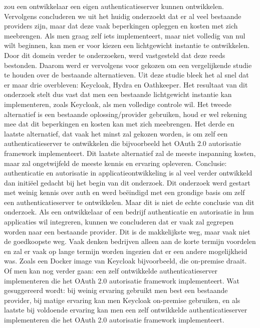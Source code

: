 zou een ontwikkelaar een eigen authenticatieserver kunnen ontwikkelen. Vervolgens concluderen we uit het huidig onderzoekt dat er al veel bestaande 
providers zijn, maar dat deze vaak beperkingen opleggen en kosten met zich meebrengen. Als men graag zelf iets implementeert, maar niet volledig
van nul wilt beginnen, kan men er voor kiezen een lichtgewicht instantie te ontwikkelen. Door dit domein verder te onderzoeken, werd vastgesteld 
dat deze reeds bestonden. Daarom werd er vervolgens voor gekozen om een vergelijkende studie te houden over de bestaande alternatieven. Uit deze
studie bleek het al snel dat er maar drie overbleven: Keycloak, Hydra en Oathkeeper. Het resultaat van dit onderzoek stelt dus vast dat men een bestaande
lichtgewicht instantie kan implementeren, zoals Keycloak, als men volledige controle wil. Het tweede alternatief is een bestaande oplossing/provider
gebruiken, houd er wel rekening mee dat dit beperkingen en kosten kan met zich meebrengen. Het derde en laatste alternatief, dat vaak het minst zal
gekozen worden, is om zelf een authenticatieserver te ontwikkelen die bijvoorbeeld het OAuth 2.0 autorisatie framework implementeert. Dit laatste alternatief
zal de meeste inspanning kosten, maar zal ongetwijfeld de meeste kennis en ervaring opleveren.
\newline
\newline
Conclusie: authenticatie en autorisatie in applicatieontwikkeling is al veel verder ontwikkeld dan initiëel gedacht bij het begin van dit onderzoek.
Dit onderzoek werd gestart met weinig kennis over auth en werd beëindigd met een grondige basis om zelf een authenticatieserver te ontwikkelen.
Maar dit is niet de echte conclusie van dit onderzoek. Als een ontwikkelaar of een bedrijf authenticatie en autorisatie in hun applicaties wil
integreren, kunnen we concluderen dat er vaak zal gegrepen worden naar een bestaande provider. Dit is de makkelijkste weg, maar vaak niet de
goedkoopste weg. Vaak denken bedrijven alleen aan de korte termijn voordelen en zal er vaak op lange termijn worden ingezien dat er een andere
mogelijkheid was. Zoals een Docker image van Keycloak bijvoorbeeld, die on-premise draait. Of men kan nog verder gaan: een zelf ontwikkelde
authenticatieserver implementeren die het OAuth 2.0 autorisatie framework implementeert. Wat gesuggereerd wordt: bij weinig ervaring gebruikt men
best een bestaande provider, bij matige ervaring kan men Keycloak on-premise gebruiken, en als laatste bij voldoende ervaring kan men een zelf
ontwikkelde authenticatieserver implementeren die het OAuth 2.0 autorisatie framework implementeert.

